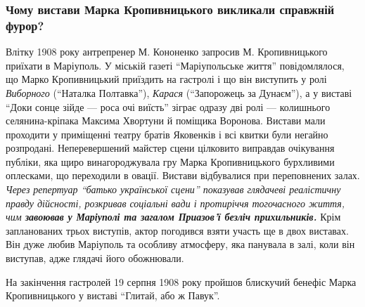  
 
 
 
 

\subsubsection{Чому вистави Марка Кропивницького викликали справжній фурор?}

Влітку 1908 року антрепренер М. Кононенко запросив М. Кропивницького приїхати в
Маріуполь. У міській газеті \enquote{Маріупольське життя} повідомлялося, що Марко
Кропивницький приїздить на гастролі і що він виступить у ролі \emph{Виборного}
(\enquote{Наталка Полтавка}), \emph{Карася} (\enquote{Запорожець за Дунаєм}), а у виставі \enquote{Доки сонце
зійде — роса очі виїсть} зіграє одразу дві ролі — колишнього селянина-кріпака
Максима Хвортуни й поміщика Воронова. Вистави мали проходити у приміщенні
театру братів Яковенків і всі квитки були негайно розпродані. Неперевершений
майстер сцени цілковито виправдав очікування публіки, яка щиро винагороджувала
гру Марка Кропивницького бурхливими оплесками, що переходили в овації. Вистави
відбувалися при переповнених залах. \emph{Через репертуар \enquote{батько української сцени}
показував глядачеві реалістичну правду дійсності, розкривав соціальні вади і
протиріччя тогочасного життя, чим \textbf{завоював у Маріуполі та загалом Приазов'ї
безліч прихильників.}} Крім запланованих трьох виступів, актор погодився взяти
участь ще в двох виставах. Він дуже любив Маріуполь та особливу атмосферу, яка
панувала в залі, коли він виступав, адже глядачі його обожнювали.



На закінчення гастролей 19 серпня 1908 року пройшов блискучий бенефіс Марка
Кропивницького у виставі \enquote{Глитай, або ж Павук}.

